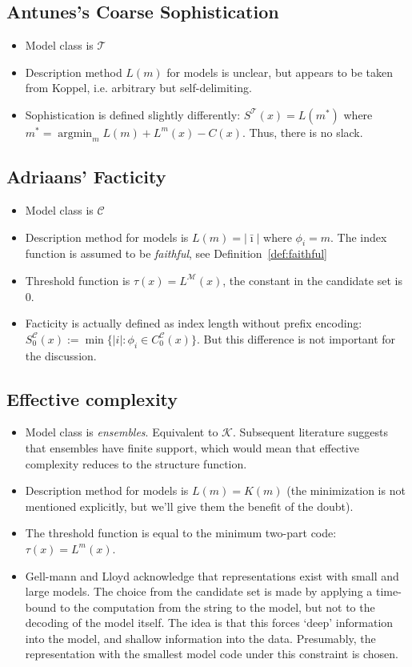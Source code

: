 \documentclass{style/llncs}
\newcommand{\M}{\mathscr M}
\newcommand{\C}{\mathscr C}
\newcommand{\T}{\mathscr T}
\newcommand{\K}{\mathscr K}
\newcommand{\argmin}{\mathop{\arg\min}}
\begin{document}
\subsection{Antunes's Coarse Sophistication}

\begin{itemize}
\item Model class is $\T$
\item Description method $L(m)$ for models is unclear, but appears to be
  taken from Koppel, i.e. arbitrary but self-delimiting.
\item Sophistication is defined slightly differently: $S^\T(x)=L(m^*)$ where $m^*=\argmin_m L(m)+L^m(x)-C(x)$. Thus, there is no slack.
\end{itemize}


\subsection{Adriaans' Facticity}

\begin{itemize}
\item Model class is $\C$
\item Description method for models is $L(m)=|\bar\imath|$ where
  $\phi_i=m$. The index function is assumed to be \emph{faithful}, see
  Definition~\ref{def:faithful}
\item Threshold function is $\tau(x)=L^\M(x)$, the constant in the candidate set is $0$.
\item Facticity is actually defined as index length without prefix
  encoding:  $S^\C_0(x):=\min\{|i|:\phi_i\in C^\C_0(x)\}$. But this
  difference is not important for the discussion.
\end{itemize}




\subsection{Effective complexity}

\begin{itemize}
\item Model class is \emph{ensembles}. Equivalent to $\K$. Subsequent literature suggests that ensembles have finite support, which would mean that effective complexity reduces to the structure function.
\item Description method for models is $L(m) = K(m)$ (the minimization is not mentioned explicitly, but we'll give them the benefit of the doubt).
\item The threshold function is equal to the minimum two-part code: $\tau(x)=L^m(x)$.
\item Gell-mann and Lloyd acknowledge that representations exist with small and large models. The choice from the candidate set is made by applying a time-bound to the computation from the string to the model, but not to the decoding of the model itself. The idea is that this forces `deep' information into the model, and shallow information into the data. Presumably, the representation with the smallest model code under this constraint is chosen.   
\end{itemize} 
\end{document}
